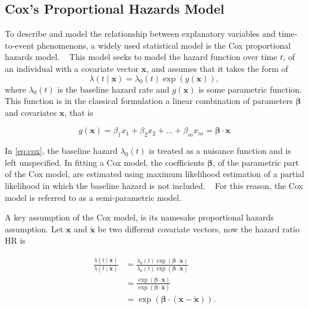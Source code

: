 \subsection{Cox's Proportional Hazards Model}

To describe and model the relationship between explanatory variables
and time-to-event phenomenons, a widely used statistical model is 
the Cox proportional hazards model. 
~\autocite{coxRegression1972}
This model seeks to model the hazard function over time \(t\),
of an individual with a covariate vector \(\mathbf{x}\),
and assumes that it takes the form of
%
\begin{equation}
    \label{eq:cox}
    \lambda (t \mid \mathbf{x}) = \lambda_0(t) \exp (g(\mathbf{x})),
\end{equation}
%
where \(\lambda_0(t)\) is the baseline hazard rate
and \(g(\mathbf{x})\) is some parametric function.
This function is in the classical formulation
a linear combination of parameters 
\(\bm{\beta}\) and covariates \(\mathbf{x}\), 
that is

\begin{equation}
    g(\mathbf{x}) 
    = \beta_1 x_1 + \beta_2 x_2 + \ldots + \beta_m x_m
    = \bm{\beta} \cdot \mathbf{x} 
\end{equation}

In \cref{eq:cox},
the baseline hazard \(\lambda_0(t)\)
is treated as a nuisance function 
and is left unspecified.
In fitting a Cox model, 
the coefficients \(\bm{\beta}\), 
of the parametric part of the Cox model, 
are estimated using maximum likelihood estimation of 
a partial likelihood in which the baseline hazard is not included.
~\autocite{kleinSurvival2003}
For this reason, the Cox model 
is referred to as a semi-parametric model.

A key assumption of the Cox model, 
is its namesake proportional hazards assumption.
Let \(\mathbf{x}\) and \(\mathbf{\check{x}}\) be 
two different covariate vectors,
now the hazard ratio \(\mathrm{HR}\) is

\begin{equation}
    \label{eq:hazard-ratio}
\begin{aligned}
    \frac{ \lambda(t \mid \mathbf{x}) }{
           \lambda(t \mid \check{\mathbf{x}}) } 
    &=
    \frac{ \lambda_0(t) \exp (\bm{\beta} \cdot \mathbf{x}) }{
           \lambda_0(t) \exp (\bm{\beta} \cdot \check{\mathbf{x}}) } \\
    &=
    \frac{ \exp (\bm{\beta} \cdot \mathbf{x}) }{
           \exp (\bm{\beta} \cdot \check{\mathbf{x}}) } \\
    &=
    \exp (
        \bm{\beta} \cdot (\mathbf{x} - \check{\mathbf{x}})
    ).
\end{aligned}
\end{equation}

